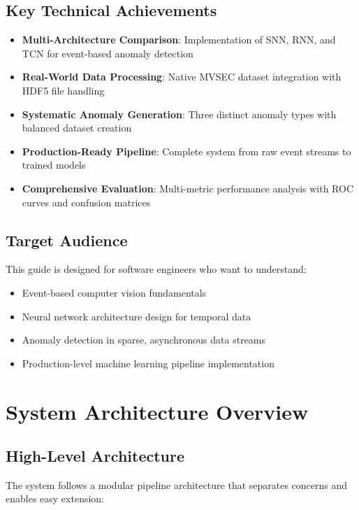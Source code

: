 \documentclass[12pt,a4paper]{article}
\begin{document}
\subsection{Key Technical Achievements}

\begin{itemize}
    \item \textbf{Multi-Architecture Comparison}: Implementation of SNN, RNN, and TCN for event-based anomaly detection
    \item \textbf{Real-World Data Processing}: Native MVSEC dataset integration with HDF5 file handling
    \item \textbf{Systematic Anomaly Generation}: Three distinct anomaly types with balanced dataset creation
    \item \textbf{Production-Ready Pipeline}: Complete system from raw event streams to trained models
    \item \textbf{Comprehensive Evaluation}: Multi-metric performance analysis with ROC curves and confusion matrices
\end{itemize}

\subsection{Target Audience}

This guide is designed for software engineers who want to understand:
\begin{itemize}
    \item Event-based computer vision fundamentals
    \item Neural network architecture design for temporal data
    \item Anomaly detection in sparse, asynchronous data streams
    \item Production-level machine learning pipeline implementation
\end{itemize}

\section{System Architecture Overview}

\subsection{High-Level Architecture}

The system follows a modular pipeline architecture that separates concerns and enables easy extension:
\end{document}
